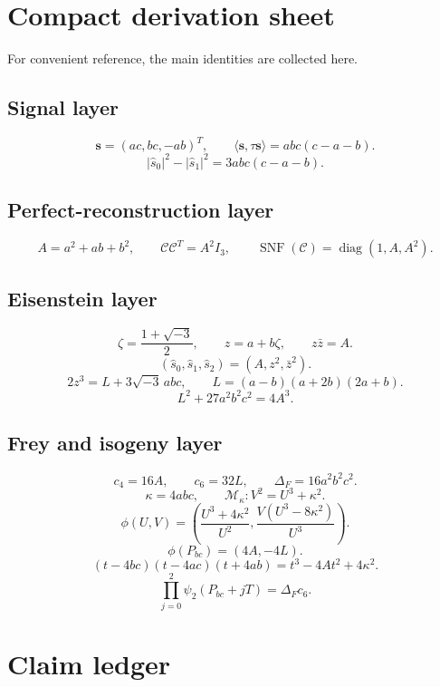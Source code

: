 \documentclass[11pt]{article}
\newcommand{\SNF}{\operatorname{SNF}}
\newcommand{\calC}{\mathcal C}
\newcommand{\calM}{\mathcal M}
\begin{document}
\appendix

\section{Compact derivation sheet}

For convenient reference, the main identities are collected here.

\subsection*{Signal layer}
\[
\mathbf s=(ac,bc,-ab)^T,
\qquad
\langle\mathbf s,\tau\mathbf s\rangle=abc(c-a-b).
\]
\[
|\widehat s_0|^2-|\widehat s_1|^2=3abc(c-a-b).
\]

\subsection*{Perfect-reconstruction layer}
\[
A=a^2+ab+b^2,
\qquad
\calC\calC^T=A^2I_3,
\qquad
\SNF(\calC)=\operatorname{diag}(1,A,A^2).
\]

\subsection*{Eisenstein layer}
\[
\zeta=\frac{1+\sqrt{-3}}2,
\qquad
z=a+b\zeta,
\qquad
z\bar z=A.
\]
\[
(\widehat s_0,\widehat s_1,\widehat s_2)=(A,z^2,\bar z^2).
\]
\[
2z^3=L+3\sqrt{-3}\,abc,
\qquad
L=(a-b)(a+2b)(2a+b).
\]
\[
L^2+27a^2b^2c^2=4A^3.
\]

\subsection*{Frey and isogeny layer}
\[
c_4=16A,
\qquad
c_6=32L,
\qquad
\Delta_F=16a^2b^2c^2.
\]
\[
\kappa=4abc,
\qquad
\calM_\kappa:V^2=U^3+\kappa^2.
\]
\[
\phi(U,V)=
\left(
\frac{U^3+4\kappa^2}{U^2},
\frac{V(U^3-8\kappa^2)}{U^3}
\right).
\]
\[
\phi(P_{bc})=(4A,-4L).
\]
\[
(t-4bc)(t-4ac)(t+4ab)=t^3-4At^2+4\kappa^2.
\]
\[
\prod_{j=0}^2\psi_2(P_{bc}+jT)=\Delta_Fc_6.
\]

\section{Claim ledger}
\end{document}
